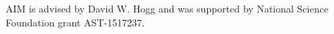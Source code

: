 \documentclass[\docopts]{\docclass}
\begin{document}





AIM is advised by David W. Hogg and was supported by National Science Foundation grant AST-1517237.



%
%




\end{document}
